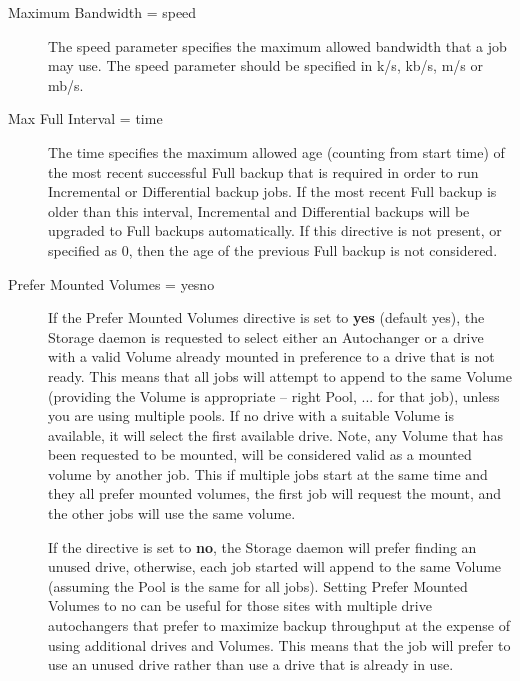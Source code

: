\begin{description}
\item [Maximum Bandwidth = \lt{}speed\gt{}]

The speed parameter specifies the maximum allowed bandwidth that a job may
use. The speed parameter should be specified in k/s, kb/s, m/s or mb/s.

\item [Max Full Interval = \lt{}time\gt{}]
   The time specifies the maximum allowed age (counting from start time) of
   the most recent successful Full backup that is required in order to run
   Incremental or Differential backup jobs. If the most recent Full backup
   is older than this interval, Incremental and Differential backups will be
   upgraded to Full backups automatically. If this directive is not present,
   or specified as 0, then the age of the previous Full backup is not
   considered.

\label{PreferMountedVolumes}
\item [Prefer Mounted Volumes = \lt{}yes\vb{}no\gt{}]
   If the Prefer Mounted Volumes directive is set to {\bf yes} (default
   yes), the Storage daemon is requested to select either an Autochanger or
   a drive with a valid Volume already mounted in preference to a drive
   that is not ready.  This means that all jobs will attempt to append
   to the same Volume (providing the Volume is appropriate -- right Pool, 
   ... for that job), unless you are using multiple pools.
   If no drive with a suitable Volume is available, it
   will select the first available drive.  Note, any Volume that has
   been requested to be mounted, will be considered valid as a mounted
   volume by another job.  This if multiple jobs start at the same time
   and they all prefer mounted volumes, the first job will request the
   mount, and the other jobs will use the same volume.

   If the directive is set to {\bf no}, the Storage daemon will prefer
   finding an unused drive, otherwise, each job started will append to the
   same Volume (assuming the Pool is the same for all jobs).  Setting
   Prefer Mounted Volumes to no can be useful for those sites
   with multiple drive autochangers that prefer to maximize backup
   throughput at the expense of using additional drives and Volumes. 
   This means that the job will prefer to use an unused drive rather
   than use a drive that is already in use.


\end{description}
